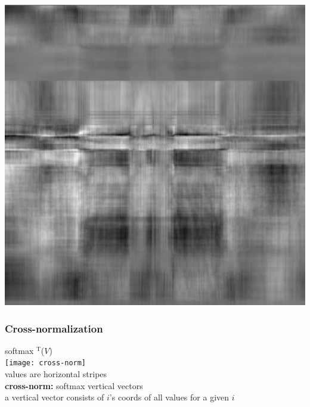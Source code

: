 \documentclass{beamer}
\newcommand{\msmagenta}[1]{{\color{mymagenta} #1}}
\begin{document}
\begin{frame}

\includegraphics[scale=0.5]{asymmetric}

\end{frame}

\begin{frame}

\frametitle{Cross-normalization}

{\LARGE softmax\msmagenta{$^\text{T}$}($V$)}\\[2ex]


\texttt{[image: cross-norm]}\\[2ex]

values are horizontal stripes\\[2ex]

{\bf cross-norm:} softmax vertical vectors\\[2ex]

a vertical vector consists of $i$'s coords of all values for a given $i$



\end{frame}
\end{document}

